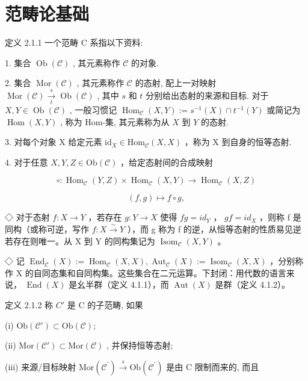\documentclass[]{article}
\begin{document}
\section{范畴论基础} 

 定义 2.1.1 一个范畴 C 系指以下资料:

1. 集合 $\operatorname{Ob}(\mathcal{C})$ , 其元素称作 $\mathcal{C}$ 的对象. 

2. 集合 $\operatorname{Mor}(\mathcal{C})$ , 其元素称作 $\mathcal{C}$ 的态射, 配上一对映射 $\operatorname{Mor}(\mathcal{C}) \xrightarrow[t]{s} \operatorname{Ob}(\mathcal{C})$ , 其中 $s$ 和 $t$ 分别给出态射的来源和目标. 对于 $X, Y \in \operatorname{Ob}(\mathcal{C})$ , 一般习惯记 $\operatorname{Hom}_{\mathcal{C}}(X, Y) := s^{-1}(X) \cap t^{-1}(Y)$ 或简记为 $\operatorname{Hom}(X, Y)$ , 称为 Hom-集, 其元素称为从 $X$ 到 $Y$ 的态射. 

3. 对每个对象 X 给定元素 $\mathrm{id}_{X} \in \mathrm{Hom}_{\mathcal{C}}(X, X)$ ，称为 X 到自身的恒等态射. 

4. 对于任意 $X, Y, Z \in \mathrm{Ob}(\mathcal{C})$ ，给定态射间的合成映射 

$$
\circ : \operatorname{Hom} _ {\mathcal {C}} (Y, Z) \times \operatorname{Hom} _ {\mathcal {C}} (X, Y) \longrightarrow \operatorname{Hom} _ {\mathcal {C}} (X, Z)
$$

$$
(f, g) \longmapsto f \circ g,
$$

◇ 对于态射 $f: X \to Y$ ，若存在 $g: Y \to X$ 使得 $fg = id_{Y}$ ， $gf = id_{X}$ ，则称 f 是同构（或称可逆，写作 $f: X \stackrel{\sim}{\to} Y$ ），而 g 称为 f 的逆，从恒等态射的性质易见逆若存在则唯一。从 X 到 Y 的同构集记为 $\operatorname{Isom}_{\mathcal{C}}(X, Y)$ 。 

◇ 记 $\operatorname{End}_{\mathcal{C}}(X):=\operatorname{Hom}_{\mathcal{C}}(X,X),\operatorname{Aut}_{\mathcal{C}}(X):=\operatorname{Isom}_{\mathcal{C}}(X,X)$ ，分别称作 X 的自同态集和自同构集。这些集合在二元运算。下封闭：用代数的语言来说， $\operatorname{End}(X)$ 是幺半群（定义 4.1.1），而 $\operatorname{Aut}(X)$ 是群（定义 4.1.2）。 

定义 2.1.2 称 $C'$ 是 C 的子范畴, 如果 

(i) $\mathrm{Ob}(\mathcal{C}') \subset \mathrm{Ob}(\mathcal{C});$ 

(ii) $\mathrm{Mor}(\mathcal{C}') \subset \mathrm{Mor}(\mathcal{C})$ , 并保持恒等态射; 

(iii) 来源/目标映射 $\mathrm{Mor}(\mathcal{C}^{\prime}) \xrightarrow{s} \mathrm{Ob}(\mathcal{C}^{\prime})$ 是由 C 限制而来的, 而且 
\end{document}
